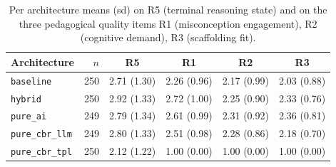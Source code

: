 \begin{table}[ht]
\centering\small
\caption{Per architecture means (sd) on R5 (terminal reasoning state) and on the three pedagogical quality items R1 (misconception engagement), R2 (cognitive demand), R3 (scaffolding fit).}
\label{tab:per-arch-means}
\begin{tabular}{lrcccc}
\toprule
Architecture & $n$ & R5 & R1 & R2 & R3 \\
\midrule
\texttt{baseline} & 250 & 2.71 (1.30) & 2.26 (0.96) & 2.17 (0.99) & 2.03 (0.88) \\
\texttt{hybrid} & 250 & 2.92 (1.33) & 2.72 (1.00) & 2.25 (0.90) & 2.33 (0.76) \\
\texttt{pure\_ai} & 249 & 2.79 (1.34) & 2.61 (0.99) & 2.31 (0.92) & 2.36 (0.81) \\
\texttt{pure\_cbr\_llm} & 249 & 2.80 (1.33) & 2.51 (0.98) & 2.28 (0.86) & 2.18 (0.70) \\
\texttt{pure\_cbr\_tpl} & 250 & 2.12 (1.22) & 1.00 (0.00) & 1.00 (0.00) & 1.00 (0.00) \\
\bottomrule
\end{tabular}
\end{table}
